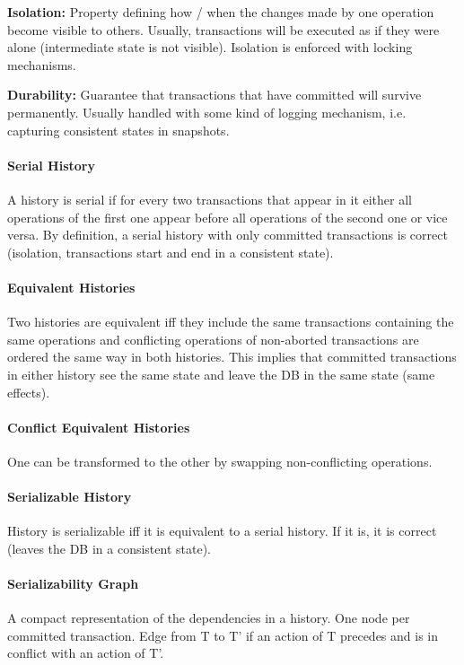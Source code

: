 \textbf{Isolation:} Property defining how / when the changes made by one operation become visible to others. Usually, transactions will be executed as if they were alone (intermediate state is not visible). Isolation is enforced with locking mechanisms.

\textbf{Durability:} Guarantee that transactions that have committed will survive permanently. Usually handled with some kind of logging mechanism, i.e. capturing consistent states in snapshots.

\paragraph{Serial History}
A history is serial if for every two transactions that appear in it either all operations of the first one appear before all operations of the second one or vice versa. By definition, a serial history with only committed transactions is correct (isolation, transactions start and end in a consistent state).

\paragraph{Equivalent Histories}
Two histories are equivalent iff they include the same transactions containing the same operations and conflicting operations of non-aborted transactions are ordered the same way in both histories. This implies that committed transactions in either history see the same state and leave the DB in the same state (same effects).

\paragraph{Conflict Equivalent Histories}
One can be transformed to the other by swapping non-conflicting operations.

\paragraph{Serializable History}
History is serializable iff it is equivalent to a serial history. If it is, it is correct (leaves the DB in a consistent state). %

\paragraph{Serializability Graph}
A compact representation of the dependencies in a history. One node per committed transaction. Edge from T to T' if an action of T precedes and is in conflict with an action of T'. %

